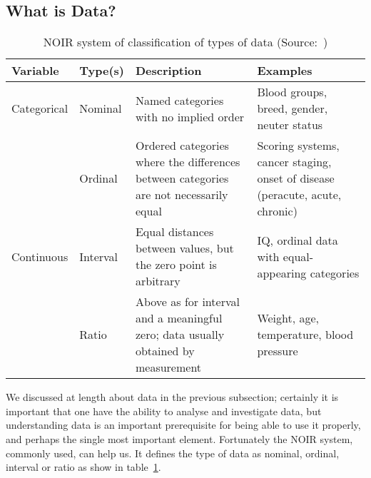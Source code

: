 \subsection{What is Data?}
\begin{table}[ht]
    \begin{tabularx}{\textwidth}{
            | >{\raggedright\arraybackslash} m{1.8cm}
            | >{\raggedright\arraybackslash} m{1.8cm}
            | >{\raggedright\arraybackslash} X
            | >{\raggedright\arraybackslash} X |}
        \toprule
        \hfil\bfseries Variable & \hfil\bfseries Type(s) & \hfil\bfseries Description                                                            & \hfil\bfseries Examples                                                      \\
        \midrule
        Categorical             & Nominal                & Named categories with no implied order                                                & Blood groups, breed, gender, neuter status                                   \\
        ~                       & Ordinal                & Ordered categories where the differences between categories are not necessarily equal & Scoring systems, cancer staging, onset of disease (peracute, acute, chronic) \\
        \midrule
        Continuous              & Interval               & Equal distances between values, but the zero point is arbitrary                        & IQ, ordinal data with equal-appearing categories                             \\
        ~                       & Ratio                  & Above as for interval and a meaningful zero; data usually obtained by measurement     & Weight, age, temperature, blood pressure                                     \\
        \bottomrule
    \end{tabularx}
    \caption{NOIR system of classification of types of data (Source:~\cite{Article:intro_to_data_analysis})}
    \label{table:noir_sys}
\end{table}
We discussed at length about data in the previous subsection; certainly it is important that one have the ability to analyse and investigate data, but 
understanding data is an important prerequisite for being able to use it properly, and perhaps the single most important element.
Fortunately the NOIR system, commonly used, can help us. It defines the type of data as nominal, ordinal, interval or ratio as show in table~\ref{table:noir_sys}.

